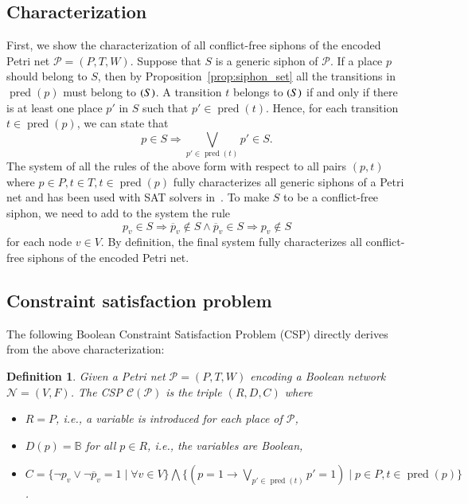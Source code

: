 \documentclass[preprint,12pt]{elsarticle}
\newtheorem{definition}{Definition}[section]
\DeclareMathOperator{\pred}{pred}
\let\succ\relax
\DeclareMathOperator{\succ}{succ}
\begin{document}
\subsection{Characterization}%
\label{subsec:siphon_characterization}

First, we show the characterization of all conflict-free siphons of the encoded Petri net \(\mathcal{P} = (P, T, W)\).
Suppose that \(S\) is a generic siphon of \(\mathcal{P}\). If a place \(p\) should belong to \(S\), then by Proposition~\ref{prop:siphon_set} all the transitions in \(\pred(p)\) must belong to \(\succ(S)\).
A transition \(t\) belongs to \(\succ(S)\) if and only if there is at least one place \(p'\) in \(S\) such that \(p' \in \pred(t)\).
Hence, for each transition \(t \in \pred(p)\), we can state that
\begin{equation}
\label{eq:siphon}
p \in S \Rightarrow \bigvee_{p' \in \pred(t)}p' \in S.
\end{equation}
The system of all the rules of the above form with respect to all pairs \((p, t)\) where \(p \in P, t \in T, t \in \pred(p)\) fully characterizes all generic siphons of a Petri net and has been used with SAT solvers in~\cite{oanea2010new,nabli2016enumerating}.
To make \(S\) to be a conflict-free siphon, we need to add to the system the rule
\begin{equation}
\label{eq:conflict}
p_v \in S \Rightarrow \overline{p}_v \not \in S \wedge \overline{p}_v \in S \Rightarrow p_v \not \in S
\end{equation}for each node \(v \in V\).
By definition, the final system fully characterizes all conflict-free siphons of the encoded Petri net.

\subsection{Constraint satisfaction problem}%
\label{subsec:computation_csp}

The following Boolean Constraint Satisfaction Problem (CSP) directly derives from the above characterization:
\begin{definition}

  Given a Petri net \(\mathcal{P} = (P, T, W)\) encoding a Boolean network \(\mathcal{N} = (V, F)\).
  The CSP \(\mathcal{C}(\mathcal{P})\) is the triple \((R, D, C)\) where
  \begin{itemize}%
    \item \(R = P\), i.e., a variable is introduced for each place of \(\mathcal{P}\),
    \item \(D(p) = \mathbb{B}\) for all \(p \in R\), i.e., the variables are Boolean,
    \item \(C = \{\neg p_v \vee \neg \overline{p}_v = 1 \mid \forall v \in V\} \bigwedge
\{(p = 1 \rightarrow \bigvee_{p' \in \pred(t)}p' = 1) \mid p \in P, t \in \pred(p)\}\).
  \end{itemize}

\end{definition}
\end{document}
